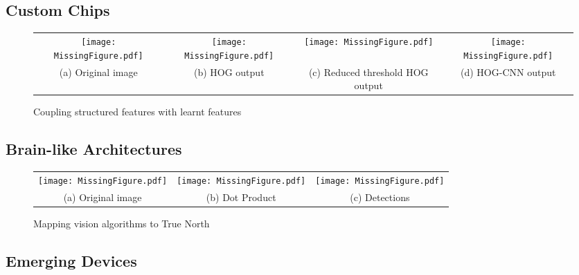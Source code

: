 \subsection{Custom Chips}

\begin{figure*}[!htb]
\centering
\begin{tabular}{@{}c@{} @{}c@{} @{}c@{} @{}c@{}}
\vspace{-5pt}
\texttt{[image: MissingFigure.pdf]} & \texttt{[image: MissingFigure.pdf]} & \texttt{[image: MissingFigure.pdf]} & \texttt{[image: MissingFigure.pdf]}\\[\abovecaptionskip]
\small(a) Original image & \small (b) HOG output & \small (c) Reduced threshold HOG output & \small (d) HOG-CNN output \\
\end{tabular}
\caption{Coupling structured features with learnt features}
\label{tab:tn}
\end{figure*}

\subsection{Brain-like Architectures}

\begin{figure*}[!htb]
\centering
\begin{tabular}{@{}c@{} @{}c@{} @{}c@{}}
\vspace{-5pt}
\texttt{[image: MissingFigure.pdf]} & \texttt{[image: MissingFigure.pdf]} & \texttt{[image: MissingFigure.pdf]}\\[\abovecaptionskip]
\small(a) Original image & \small (b) Dot Product & \small (c) Detections \\
\end{tabular}
\caption{Mapping vision algorithms to True North}
\label{tab:tn}
\end{figure*}

\subsection{Emerging Devices}

